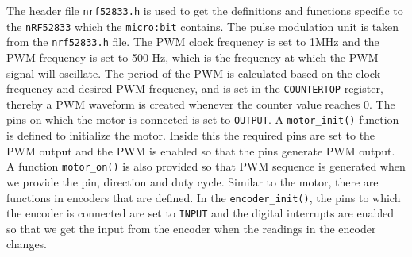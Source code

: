 The header file \texttt{nrf52833.h} is used to get the definitions and functions specific to the \texttt{nRF52833} which the \texttt{micro:bit} contains.
The pulse modulation unit is taken from the \texttt{nrf52833.h} file.
The PWM clock frequency is set to 1MHz and the PWM frequency is set to 500 Hz, which is the frequency at which the PWM signal will oscillate.
The period of the PWM is calculated based on the clock frequency and desired PWM frequency, and is set in the \texttt{COUNTERTOP} register, thereby a PWM waveform is created whenever the counter value reaches 0.
The pins on which the motor is connected is set to \texttt{OUTPUT}.
A \texttt{motor\_init\@()} function is defined to initialize the motor.
Inside this the required pins are set to the PWM output and the PWM is enabled so that the pins generate PWM output.
A function \texttt{motor\_on\@()} is also provided so that PWM sequence is generated when we provide the pin, direction and duty cycle.
Similar to the motor, there are functions in encoders that are defined.
In the \texttt{encoder\_init\@()}, the pins to which the encoder is connected are set to \texttt{INPUT} and the digital interrupts are enabled so that we get the input from the encoder when the readings in the encoder changes.
